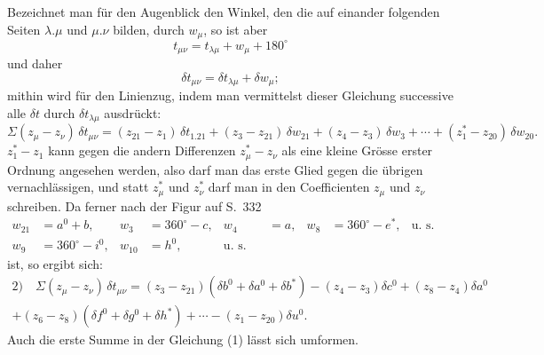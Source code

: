 \documentclass[12pt,a4paper]{article}
\theoremstyle{plain}
\theoremstyle{definition}
\theoremstyle{remark}
\begin{document}
Bezeichnet man f\"ur den Augenblick den Winkel, den die auf einander folgenden Seiten $\lambda.\mu$ und $\mu.\nu$ bilden, durch $w_\mu$, so ist aber
\[t_{\mu\nu} = t_{\lambda\mu} + w_\mu + 180^{\circ}\]
und daher
\[\delta t_{\mu\nu} = \delta t_{\lambda\mu} + \delta w_\mu;\]
mithin wird f\"ur den Linienzug, indem man vermittelst dieser Gleichung successive alle $\delta t$ durch $\delta t_{\lambda\mu}$ ausdr\"uckt:
\[\Sigma(z_\mu - z_\nu)\,\delta t_{\mu\nu} = (z_{21} - z_1)\,\delta t_{1.21} + (z_3 - z_{21})\,\delta w_{21} + (z_4 - z_3)\,\delta w_3 + \cdots + (z_1^* - z_{20})\,\delta w_{20}.\]
$z_1^* - z_1$ kann gegen die andern Differenzen $z_\mu^* - z_\nu$ als eine kleine Gr\"osse erster Ordnung angesehen werden, also darf man das erste Glied gegen die \"ubrigen vernachl\"assigen, und statt $z_\mu^*$ und $z_\nu^*$ darf man in den Coefficienten $z_\mu$ und $z_\nu$ schreiben. Da ferner nach der Figur auf S.\ 332
\begin{align*}
w_{21} &= a^0 + b, & w_3 &= 360^{\circ} - c, & w_4 &= a, & w_8 &= 360^{\circ} - e^*, & \text{u.\ s.\ w.,}\\
w_9 &= 360^{\circ} - i^0, & w_{10} &= h^0, & \text{u.\ s.\ w.}
\end{align*}
ist, so ergibt sich:
\begin{multline*}
\text{2)}\quad \Sigma(z_\mu - z_\nu)\,\delta t_{\mu\nu} = (z_3 - z_{21})(\delta b^0 + \delta a^0 + \delta b^*) - (z_4 - z_3)\delta c^0 + (z_8 - z_4)\delta a^0\\
+ (z_6 - z_8)(\delta f^0 + \delta g^0 + \delta h^*) + \cdots - (z_1 - z_{20})\delta u^0.
\end{multline*}
Auch die erste Summe in der Gleichung (1) l\"asst sich umformen.
\end{document}
